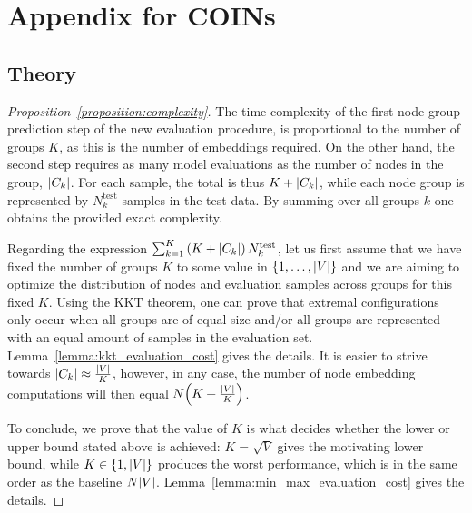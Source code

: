 \appendix
\chapter{Appendix for COINs}

\section{Theory}
\label{sec:appendix_proofs}

\begin{proof}[Proposition~\ref{proposition:complexity}]
    The time complexity of the first node group prediction step of the new evaluation procedure, is proportional to the number of groups $K$, as this is the number of embeddings required. On the other hand, the second step requires as many model evaluations as the number of nodes in the group, $\mathopen{}\left|C_k\right|$. For each sample, the total is thus $K+\mathopen{}\left|C_k\right|$, while each node group is represented by $N_k^{\text{test}}$ samples in the test data. By summing over all groups $k$ one obtains the provided exact complexity.

    Regarding the expression $\sum_{k=1}^{K}{\mathopen{}\left(K+\mathopen{}\left|C_k\right|\right)N_k^{\text{test}}}$, let us first assume that we have fixed the number of groups $K$ to some value in $\mathopen{}\left\{1,\dots,\mathopen{}\left|V\right|\right\}$ and we are aiming to optimize the distribution of nodes and evaluation samples across groups for this fixed $K$. Using the KKT theorem, one can prove that extremal configurations only occur when all groups are of equal size and/or all groups are represented with an equal amount of samples in the evaluation set. Lemma~\ref{lemma:kkt_evaluation_cost} gives the details. It is easier to strive towards $\mathopen{}\left|C_k\right| \approx \frac{\mathopen{}\left|V\right|}{K}$, however, in any case, the number of node embedding computations will then equal $N\mathopen{}\left(K + \frac{\mathopen{}\left|V\right|}{K}\right)$. 
    
    To conclude, we prove that the value of $K$ is what decides whether the lower or upper bound stated above is achieved: $K=\sqrt{V}$ gives the motivating lower bound, while $K \in \mathopen{}\left\{1, \mathopen{}\left|V\right|\right\}$ produces the worst performance, which is in the same order as the baseline $N \mathopen{}\left|V\right|$. Lemma~\ref{lemma:min_max_evaluation_cost} gives the details.
\end{proof}

